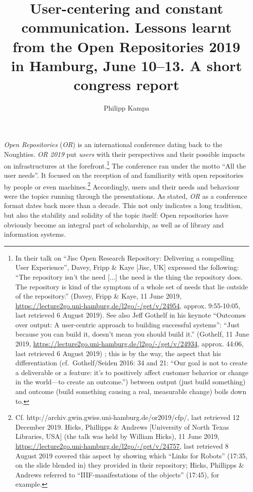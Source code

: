 \documentclass[a4paper,
fontsize=11pt,
oneside,
numbers=noperiodatend,
parskip=half-,
bibliography=totoc,
final
]{scrartcl}
\title{\LARGE{User-centering and constant communication. Lessons learnt from the Open Repositories 2019 in Hamburg, June 10–13. A short congress report}} %
\author{Philipp Kampa} %
\date{}
\begin{document}
\maketitle
\thispagestyle{fancyplain} 


\emph{Open Repositories} (\emph{OR}) is an international conference
dating back to the Noughties. \emph{OR 2019} put \emph{users} with their
perspectives and their possible impacts on infrastructures at the
forefront.\footnote{In their talk on \enquote{Jisc Open Research
  Repository: Delivering a compelling User Experience}, Davey, Fripp \&
  Kaye {[}Jisc, UK{]} expressed the following: \enquote{The repository
  isn't the need {[}...{]} the need is the thing the repository does.
  The repository is kind of the symptom of a whole set of needs that lie
  outside of the repository.} (Davey, Fripp \& Kaye, 11 June 2019,
  \url{https://lecture2go.uni-hamburg.de/l2go/-/get/v/24954}, approx.
  9:55-10:05, last retrieved 6 August 2019). See also Jeff Gothelf in
  his keynote \enquote{Outcomes over output: A user-centric approach to
  building successful systems}: \enquote{Just because you can build it,
  doesn't mean you should build it.} (Gothelf, 11 June 2019,
  \url{https://lecture2go.uni-hamburg.de/l2go/-/get/v/24934}, approx.
  44:06, last retrieved 6 August 2019) ; this is by the way, the aspect
  that his differentiation (cf.~Gothelf/Seiden 2016: 34 and 21:
  \enquote{Our goal is not to create a deliverable or a feature: it's to
  positively affect customer behavior or change in the world---to create
  an outcome.}) between output (just build something) and outcome (build
  something causing a real, measurable change) boils down to.} The
conference ran under the motto \enquote{All the user needs}. It focused
on the reception of and familiarity with open repositories by people or
even machines.\footnote{Cf.
  http://archiv.gwin.gwiss.uni-hamburg.de/or2019/cfp/, last retrieved 12
  December 2019. Hicks, Phillipps \& Andrews {[}University of North
  Texas Libraries, USA{]} (the talk was held by William Hicks), 11 June
  2019, \url{https://lecture2go.uni-hamburg.de/l2go/-/get/v/24757}, last
  retrieved 8 August 2019 covered this aspect by showing which
  \enquote{Links for Robots} (17:35, on the slide blended in) they
  provided in their repository; Hicks, Phillipps \& Andrews referred to
  \enquote{IIIF-manifestations of the objects} (17:45), for example.}
Accordingly, users and their needs and behaviour were the topics running
through the presentations. As stated, \emph{OR} as a conference format
dates back more than a decade. This not only indicates a long tradition,
but also the stability and solidity of the topic itself: Open
repositories have obviously become an integral part of scholarship, as
well as of library and information systems.
\end{document}
